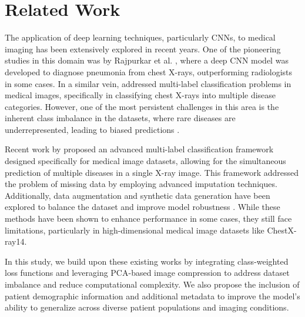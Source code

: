 \section{Related Work}
The application of deep learning techniques, particularly CNNs, to medical imaging has been extensively explored in recent years. One of the pioneering studies in this domain was by Rajpurkar et al. \cite{rajpurkar2017chexnet}, where a deep CNN model was developed to diagnose pneumonia from chest X-rays, outperforming radiologists in some cases. In a similar vein, \cite{sethi2018chestx} addressed multi-label classification problems in medical images, specifically in classifying chest X-rays into multiple disease categories. However, one of the most persistent challenges in this area is the inherent class imbalance in the datasets, where rare diseases are underrepresented, leading to biased predictions \cite{johnson2019survey}.

Recent work by \cite{luo2017multi} proposed an advanced multi-label classification framework designed specifically for medical image datasets, allowing for the simultaneous prediction of multiple diseases in a single X-ray image. This framework addressed the problem of missing data by employing advanced imputation techniques. Additionally, data augmentation and synthetic data generation have been explored to balance the dataset and improve model robustness \cite{shorten2019survey}. While these methods have been shown to enhance performance in some cases, they still face limitations, particularly in high-dimensional medical image datasets like ChestX-ray14.

In this study, we build upon these existing works by integrating class-weighted loss functions and leveraging PCA-based image compression to address dataset imbalance and reduce computational complexity. We also propose the inclusion of patient demographic information and additional metadata to improve the model's ability to generalize across diverse patient populations and imaging conditions.